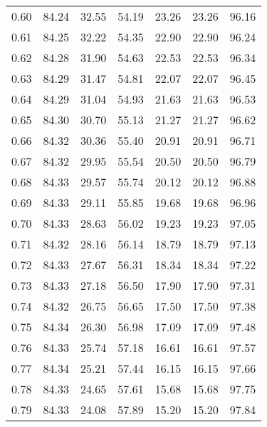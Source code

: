 \begin{tabular}{|c|c|c|c|c|c|c|}
      0.60 &     84.24 &     32.55 &      54.19 &   23.26 &      23.26 &         96.16 \\
      0.61 &     84.25 &     32.22 &      54.35 &   22.90 &      22.90 &         96.24 \\
      0.62 &     84.28 &     31.90 &      54.63 &   22.53 &      22.53 &         96.34 \\
      0.63 &     84.29 &     31.47 &      54.81 &   22.07 &      22.07 &         96.45 \\
      0.64 &     84.29 &     31.04 &      54.93 &   21.63 &      21.63 &         96.53 \\
      0.65 &     84.30 &     30.70 &      55.13 &   21.27 &      21.27 &         96.62 \\
      0.66 &     84.32 &     30.36 &      55.40 &   20.91 &      20.91 &         96.71 \\
      0.67 &     84.32 &     29.95 &      55.54 &   20.50 &      20.50 &         96.79 \\
      0.68 &     84.33 &     29.57 &      55.74 &   20.12 &      20.12 &         96.88 \\
      0.69 &     84.33 &     29.11 &      55.85 &   19.68 &      19.68 &         96.96 \\
      0.70 &     84.33 &     28.63 &      56.02 &   19.23 &      19.23 &         97.05 \\
      0.71 &     84.32 &     28.16 &      56.14 &   18.79 &      18.79 &         97.13 \\
      0.72 &     84.33 &     27.67 &      56.31 &   18.34 &      18.34 &         97.22 \\
      0.73 &     84.33 &     27.18 &      56.50 &   17.90 &      17.90 &         97.31 \\
      0.74 &     84.32 &     26.75 &      56.65 &   17.50 &      17.50 &         97.38 \\
      0.75 &     84.34 &     26.30 &      56.98 &   17.09 &      17.09 &         97.48 \\
      0.76 &     84.33 &     25.74 &      57.18 &   16.61 &      16.61 &         97.57 \\
      0.77 &     84.34 &     25.21 &      57.44 &   16.15 &      16.15 &         97.66 \\
      0.78 &     84.33 &     24.65 &      57.61 &   15.68 &      15.68 &         97.75 \\
      0.79 &     84.33 &     24.08 &      57.89 &   15.20 &      15.20 &         97.84 \\

\end{tabular}
